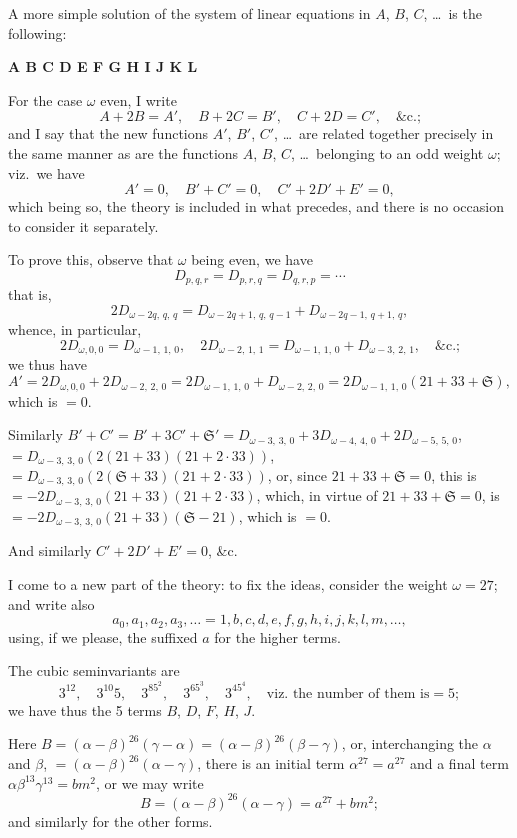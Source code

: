 \documentclass[11pt,a4paper]{book}
\begin{document}
A more simple solution of the system of linear equations in $A$, $B$, $C$, \ldots\ is the following:

\medskip
\begin{center}
\textbf{A B C D E F G H I J K L}
\end{center}
\medskip

For the case $\omega$ even, I write
\[
A + 2B = A', \quad B + 2C = B', \quad C + 2D = C', \quad \text{\&c.;}
\]
and I say that the new functions $A'$, $B'$, $C'$, \ldots\ are related together precisely in the same manner as are the functions $A$, $B$, $C$, \ldots\ belonging to an odd weight $\omega$; viz.\ we have
\[
A' = 0, \quad B' + C' = 0, \quad C' + 2D' + E' = 0,
\]
which being so, the theory is included in what precedes, and there is no occasion to consider it separately.

To prove this, observe that $\omega$ being even, we have
\[
D_{p,q,r} = D_{p,r,q} = D_{q,r,p} = \cdots
\]
that is,
\[
2D_{\omega-2q,\,q,\,q} = D_{\omega-2q+1,\,q,\,q-1} + D_{\omega-2q-1,\,q+1,\,q},
\]
whence, in particular,
\[
2D_{\omega,0,0} = D_{\omega-1,\,1,\,0}, \quad 2D_{\omega-2,\,1,\,1} = D_{\omega-1,\,1,\,0} + D_{\omega-3,\,2,\,1}, \quad \text{\&c.;}
\]
we thus have
\[
A' = 2D_{\omega,0,0} + 2D_{\omega-2,\,2,\,0} = 2D_{\omega-1,\,1,\,0} + D_{\omega-2,\,2,\,0} = 2D_{\omega-1,\,1,\,0}(21 + 33 + \mathfrak{S}),
\]
which is $= 0$.

Similarly $B' + C' = B' + 3C' + \mathfrak{S}' = D_{\omega-3,\,3,\,0} + 3D_{\omega-4,\,4,\,0} + 2D_{\omega-5,\,5,\,0}$, $= D_{\omega-3,\,3,\,0}(2(21 + 33)(21 + 2\cdot 33))$, $= D_{\omega-3,\,3,\,0}(2(\mathfrak{S} + 33)(21 + 2\cdot 33))$, or, since $21 + 33 + \mathfrak{S} = 0$, this is $= -2D_{\omega-3,\,3,\,0}(21 + 33)(21 + 2\cdot 33)$, which, in virtue of $21 + 33 + \mathfrak{S} = 0$, is $= -2D_{\omega-3,\,3,\,0}(21 + 33)(\mathfrak{S} - 21)$, which is $= 0$.

And similarly $C' + 2D' + E' = 0$, \&c.

I come to a new part of the theory: to fix the ideas, consider the weight $\omega = 27$; and write also
\[
a_0, a_1, a_2, a_3, \ldots = 1, b, c, d, e, f, g, h, i, j, k, l, m, \ldots,
\]
using, if we please, the suffixed $a$ for the higher terms.

The cubic seminvariants are
\[
3^{12}, \quad 3^{10}5, \quad 3^85^2, \quad 3^65^3, \quad 3^45^4, \quad \text{viz.\ the number of them is} = 5;
\]
we have thus the 5 terms $B$, $D$, $F$, $H$, $J$.

Here $B = (\alpha - \beta)^{26}(\gamma - \alpha) = (\alpha - \beta)^{26}(\beta - \gamma)$, or, interchanging the $\alpha$ and $\beta$, $= (\alpha - \beta)^{26}(\alpha - \gamma)$, there is an initial term $\alpha^{27} = a^{27}$ and a final term $\alpha\beta^{13}\gamma^{13} = bm^2$, or we may write
\[
B = (\alpha - \beta)^{26}(\alpha - \gamma) = a^{27} + bm^2;
\]
and similarly for the other forms.
\end{document}
